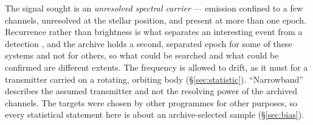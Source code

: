 The signal sought is an \emph{unresolved spectral carrier} --- emission confined
to a few channels, unresolved at the stellar position, and present at more
than one epoch. Recurrence rather than brightness is what separates an
interesting event from a detection \citep{Sheikh2021}, and the archive holds
a second, separated epoch for some of these systems and not for others, so
what could be searched and what could be confirmed are different extents. The
frequency is allowed to drift, as it must for a transmitter carried on a
rotating, orbiting body (\S\ref{sec:statistic}). ``Narrowband'' describes the
assumed transmitter and not the resolving power of the archived channels. The
targets were chosen by other programmes for other purposes, so every
statistical statement here is about an archive-selected sample
(\S\ref{sec:bias}).
